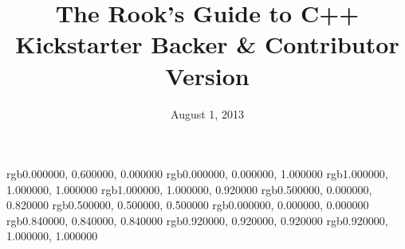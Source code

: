 \documentclass[11pt,final]{book}
\title{The Rook's Guide to C++
 \\ \small{Kickstarter Backer \& Contributor Version}
      }
\date{August 1, 2013}
\begin{document}
 \maketitle
 \thispagestyle{empty}
 \newpage

 \setcounter{page}{1}
 \tableofcontents


 \definecolor{CommentColor}                    {rgb}{0.000000, 0.600000, 0.000000}
 \definecolor{KeywordStyleColor}               {rgb}{0.000000, 0.000000, 1.000000}
 \definecolor{ListingBgColor}                  {rgb}{1.000000, 1.000000, 1.000000}
 \definecolor{ListingFrameColor}               {rgb}{1.000000, 1.000000, 0.920000}
 \definecolor{LiteralStringColor}              {rgb}{0.500000, 0.000000, 0.820000}
 \definecolor{NumStyleColor}                   {rgb}{0.500000, 0.500000, 0.500000}
 \definecolor{RuleColor}                       {rgb}{0.000000, 0.000000, 0.000000}
 \definecolor{RuleSepColor}                    {rgb}{0.840000, 0.840000, 0.840000}
 \definecolor{ShadowBoxFrameColor}             {rgb}{0.920000, 0.920000, 0.920000}
 \definecolor{ShadowBoxColor}                  {rgb}{0.920000, 1.000000, 1.000000}
\end{document}
